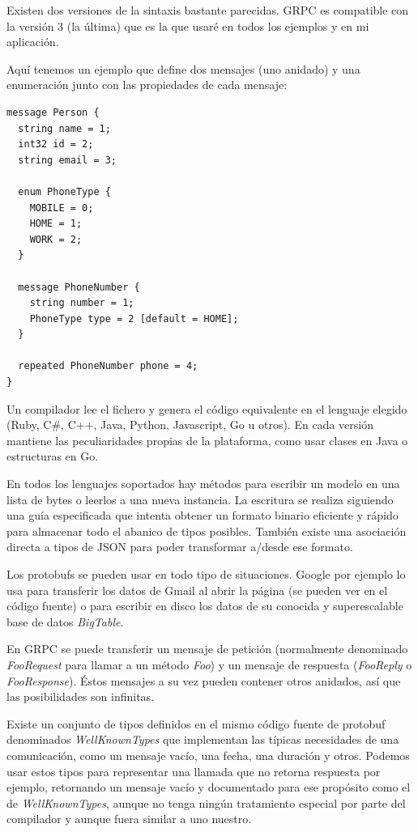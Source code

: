 Existen dos versiones de la sintaxis bastante parecidas. GRPC es compatible con la versión 3 (la última) que es la que usaré en todos los ejemplos y en mi aplicación.

Aquí tenemos un ejemplo que define dos mensajes (uno anidado) y una enumeración junto con las propiedades de cada mensaje:

\begin{verbatim}
message Person {
  string name = 1;
  int32 id = 2;
  string email = 3;

  enum PhoneType {
    MOBILE = 0;
    HOME = 1;
    WORK = 2;
  }

  message PhoneNumber {
    string number = 1;
    PhoneType type = 2 [default = HOME];
  }

  repeated PhoneNumber phone = 4;
}
\end{verbatim}

Un compilador lee el fichero y genera el código equivalente en el lenguaje elegido (Ruby, C\#, C++, Java, Python, Javascript, Go u otros). En cada versión mantiene las peculiaridades propias de la plataforma, como usar clases en Java o estructuras en Go.

En todos los lenguajes soportados hay métodos para escribir un modelo en una lista de bytes o leerlos a una nueva instancia. La escritura se realiza siguiendo una guía especificada\cite{protoencoding} que intenta obtener un formato binario eficiente y rápido para almacenar todo el abanico de tipos posibles. También existe una asociación directa a tipos de JSON\cite{protojson} para poder transformar a/desde ese formato.

Los protobufs se pueden usar en todo tipo de situaciones. Google por ejemplo lo usa para transferir los datos de Gmail al abrir la página (se pueden ver en el código fuente) o para escribir en disco los datos de su conocida y superescalable base de datos \emph{BigTable}\cite{bigtable}.

En GRPC se puede transferir un mensaje de petición (normalmente denominado \emph{FooRequest} para llamar a un método \emph{Foo}) y un mensaje de respuesta (\emph{FooReply} o \emph{FooResponse}). Éstos mensajes a su vez pueden contener otros anidados, así que las posibilidades son infinitas.

Existe un conjunto de tipos definidos en el mismo código fuente de protobuf denominados \emph{WellKnownTypes}\cite{wellknowntypes} que implementan las típicas necesidades de una comunicación, como un mensaje vacío, una fecha, una duración y otros. Podemos usar estos tipos para representar una llamada que no retorna respuesta por ejemplo, retornando un mensaje vacío y documentado para ese propósito como el de \emph{WellKnownTypes}, aunque no tenga ningún tratamiento especial por parte del compilador y aunque fuera similar a uno nuestro.

